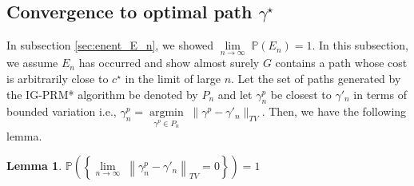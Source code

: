 \documentclass[Afour,sageh,times]{sagej}
\newtheorem{lemma}{\bf Lemma}
\DeclareMathOperator*{\argmin}{argmin}
\begin{document}
\subsection{Convergence to optimal path \texorpdfstring{ $\gamma^\star$}{g}}
\label{sec:convergence_to_optimal}

In subsection \ref{sec:enent_E_n}, we showed $ \underset{n\rightarrow\infty}{\lim}\; \mathbb{P}\left(E_n \right)=1\nonumber$. In this subsection, we assume $E_n$ has occurred and show almost surely $G$ contains a path whose cost is arbitrarily close to $c^\star$ in the limit of large $n$. Let the set of paths generated by the IG-PRM* algorithm be denoted by $P_n$ and let $\gamma^p_n$ be closest to $\gamma'_n$ in terms of bounded variation i.e., $\gamma^p_n=\underset{\gamma^p\in P_n}{\argmin}\;\|\gamma^p-\gamma'_n\|_{TV}$. Then, we have the following lemma.
\begin{lemma}
$\mathbb{P}\left(\left\{\underset{n\rightarrow\infty}{\lim}\;\left\|\gamma^p_{n}-\gamma'_{n}\right\|_{TV}=0\right\}\right)=1$
\label{lemma:arbritrarily_close}
\end{lemma}
\end{document}
